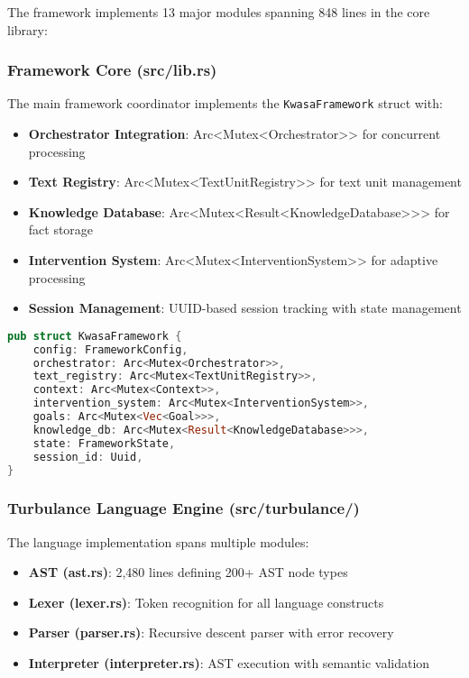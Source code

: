 \documentclass[12pt,a4paper,twoside]{article}
\begin{document}
\begin{itemize}
The framework implements 13 major modules spanning 848 lines in the core library:

\subsubsection{Framework Core (src/lib.rs)}

The main framework coordinator implements the \texttt{KwasaFramework} struct with:

\begin{itemize}
\item \textbf{Orchestrator Integration}: Arc<Mutex<Orchestrator>> for concurrent processing
\item \textbf{Text Registry}: Arc<Mutex<TextUnitRegistry>> for text unit management
\item \textbf{Knowledge Database}: Arc<Mutex<Result<KnowledgeDatabase>>> for fact storage
\item \textbf{Intervention System}: Arc<Mutex<InterventionSystem>> for adaptive processing
\item \textbf{Session Management}: UUID-based session tracking with state management
\end{itemize}

\begin{lstlisting}[language=rust,caption=Framework Core Structure]
pub struct KwasaFramework {
    config: FrameworkConfig,
    orchestrator: Arc<Mutex<Orchestrator>>,
    text_registry: Arc<Mutex<TextUnitRegistry>>,
    context: Arc<Mutex<Context>>,
    intervention_system: Arc<Mutex<InterventionSystem>>,
    goals: Arc<Mutex<Vec<Goal>>>,
    knowledge_db: Arc<Mutex<Result<KnowledgeDatabase>>>,
    state: FrameworkState,
    session_id: Uuid,
}
\end{lstlisting}

\subsubsection{Turbulance Language Engine (src/turbulance/)}

The language implementation spans multiple modules:

\begin{itemize}
\item \textbf{AST (ast.rs)}: 2,480 lines defining 200+ AST node types
\item \textbf{Lexer (lexer.rs)}: Token recognition for all language constructs
\item \textbf{Parser (parser.rs)}: Recursive descent parser with error recovery
\item \textbf{Interpreter (interpreter.rs)}: AST execution with semantic validation
\end{itemize}


\end{itemize}
\end{document}
